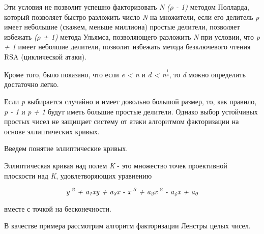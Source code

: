   Эти условия не позволит успешно факторизовать \textit{N} \textit{({$\rho$} - 1)} методом Полларда, который позволяет быстро разложить 
число \textit{N} на множители, если его делитель \textit{p} имеет небольшие (скажем, меньше миллиона) простые делители, позволяет 
избежать \textit{({$\rho$} + 1)} метода Ульямса, позволяющего разложить \textit{N} при условии, что \textit{p + 1} имеет неболшие делители, 
позволит избежать метода безключевого чтения RSA (циклической атаки).

  Кроме того, было показано, что если \textit{e < n} и \textit{d < n\textsuperscript{ {$\frac{1}{4}$}}}, то \textit{d} можно определить достаточно
легко.
  
  Если \textit{p} выбирается случайно и имеет довольно большой размер, то, как правило, \textit{p - 1} и \textit{p + 1} будут иметь 
большие простые делители. Однако выбор устойчивых простых чисел не защищает систему от атаки алгоритмом факторизации на основе 
эллиптических кривых.

  Введем понятие эллиптические кривых.
  
    \begin{definition}
      Эллиптическая кривая над полем \textit{K} - это множество точек проективной плоскости над \textit{K}, удовлетворяющих уравнению
      
	\begin{equation}
	  \textit{y\textsuperscript{ 2} + a\textsubscript{1}xy + a\textsubscript{3}x - x\textsuperscript{ 3} + a\textsubscript{2}x\textsuperscript{ 2} - a\textsubscript{4}x + a\textsubscript{0}}
	\end{equation}
      
      вместе с точкой на бесконечности.    
    \end{definition}
    
  В качестве примера рассмотрим алгоритм факторизации Ленстры целых чисел.
  
